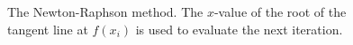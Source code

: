 \begin{figure}[h]
    \vspace{-2em}\caption{The Newton-Raphson method. The $x$-value of the root of the tangent line at $f(x_i)$ is used to evaluate the next iteration.\label{fig:NR}}
\end{figure}
\captionsetup[subfigure]{labelformat=parens}


